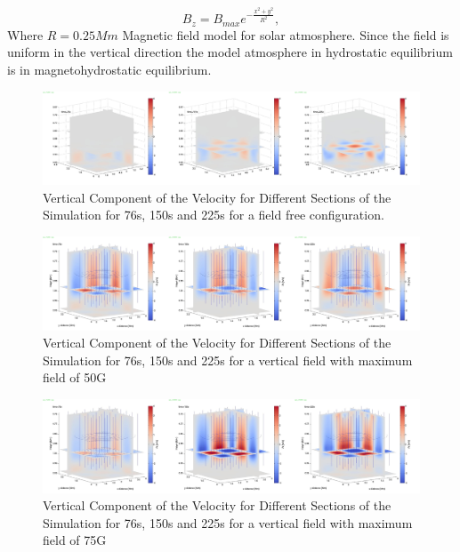 \documentclass[twocolumn]{aastex62}
\begin{document}
\begin{equation}
B_{z}=B_{max} e^{-\frac{x^2+y^2}{R^2}} , \label{e7}
\end{equation}
Where $R=0.25Mm$
Magnetic field model for solar atmosphere. Since the field is uniform in the vertical direction the model atmosphere in hydrostatic equilibrium is in magnetohydrostatic equilibrium.

\begin{figure}\label{vzplot_bv0g_76_150_225}
\includegraphics[scale=0.146]{imrescale/vz_bv0g_76_150_225.jpg}
\caption{Vertical Component of the Velocity for Different Sections of the Simulation for 76s, 150s and 225s for a field free configuration.}
\end{figure}

\begin{figure}\label{vzplot_bv50g_76_150_225}
\includegraphics[scale=0.146]{imrescale/vz_bv50g_76_150_225.jpg}
\caption{Vertical Component of the Velocity for Different Sections of the Simulation for 76s, 150s and 225s for a vertical field with maximum field of 50G}
\end{figure}

\begin{figure}\label{vzplot_bv75g_76_150_225}
\includegraphics[scale=0.146]{imrescale/vz_bv75g_76_150_225.jpg}
\caption{Vertical Component of the Velocity for Different Sections of the Simulation for 76s, 150s and 225s for a vertical field with maximum field of 75G}
\end{figure}
\end{document}
